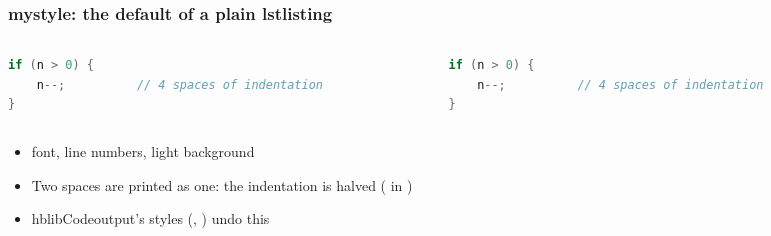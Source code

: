\documentclass[aspectratio=169,10pt,compress]{beamer}
\begin{document}
\begin{frame}[t,fragile] \frametitle{mystyle: the default of a plain lstlisting}
	\begin{columns}[T]
		\begin{column}{0.48\textwidth}

\begin{texcode}
\begin{lstlisting}[language=Java]
if (n > 0) {
    n--;          // 4 spaces of indentation
}
\end{lstlisting}
\end{texcode}

		\end{column}
		\begin{column}{0.48\textwidth}

\begin{lstlisting}[language=Java]
if (n > 0) {
    n--;          // 4 spaces of indentation
}
\end{lstlisting}

		\end{column}
	\end{columns}

	\begin{itemize}\small
		\item {} font, line numbers, light background
		\item Two spaces are printed as one: the indentation is halved ( in )
		\item hblibCodeoutput's styles (, ) undo this
	\end{itemize}
\end{frame}




\end{document}
